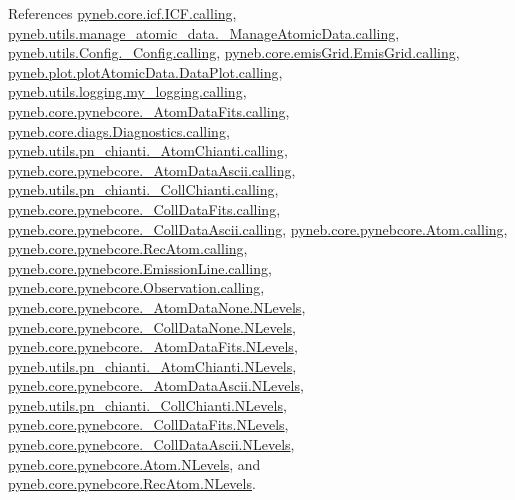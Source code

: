References \hyperlink{icf_8py_source_l00016}{pyneb.\+core.\+icf.\+I\+C\+F.\+calling}, \hyperlink{manage__atomic__data_8py_source_l00018}{pyneb.\+utils.\+manage\+\_\+atomic\+\_\+data.\+\_\+\+Manage\+Atomic\+Data.\+calling}, \hyperlink{_config_8py_source_l00032}{pyneb.\+utils.\+Config.\+\_\+\+Config.\+calling}, \hyperlink{emis_grid_8py_source_l00041}{pyneb.\+core.\+emis\+Grid.\+Emis\+Grid.\+calling}, \hyperlink{plot_atomic_data_8py_source_l00042}{pyneb.\+plot.\+plot\+Atomic\+Data.\+Data\+Plot.\+calling}, \hyperlink{logging_8py_source_l00044}{pyneb.\+utils.\+logging.\+my\+\_\+logging.\+calling}, \hyperlink{pynebcore_8py_source_l00090}{pyneb.\+core.\+pynebcore.\+\_\+\+Atom\+Data\+Fits.\+calling}, \hyperlink{diags_8py_source_l00169}{pyneb.\+core.\+diags.\+Diagnostics.\+calling}, \hyperlink{pn__chianti_8py_source_l00223}{pyneb.\+utils.\+pn\+\_\+chianti.\+\_\+\+Atom\+Chianti.\+calling}, \hyperlink{pynebcore_8py_source_l00311}{pyneb.\+core.\+pynebcore.\+\_\+\+Atom\+Data\+Ascii.\+calling}, \hyperlink{pn__chianti_8py_source_l00414}{pyneb.\+utils.\+pn\+\_\+chianti.\+\_\+\+Coll\+Chianti.\+calling}, \hyperlink{pynebcore_8py_source_l00568}{pyneb.\+core.\+pynebcore.\+\_\+\+Coll\+Data\+Fits.\+calling}, \hyperlink{pynebcore_8py_source_l00918}{pyneb.\+core.\+pynebcore.\+\_\+\+Coll\+Data\+Ascii.\+calling}, \hyperlink{pynebcore_8py_source_l01175}{pyneb.\+core.\+pynebcore.\+Atom.\+calling}, \hyperlink{pynebcore_8py_source_l02572}{pyneb.\+core.\+pynebcore.\+Rec\+Atom.\+calling}, \hyperlink{pynebcore_8py_source_l03263}{pyneb.\+core.\+pynebcore.\+Emission\+Line.\+calling}, \hyperlink{pynebcore_8py_source_l03419}{pyneb.\+core.\+pynebcore.\+Observation.\+calling}, \hyperlink{pynebcore_8py_source_l00062}{pyneb.\+core.\+pynebcore.\+\_\+\+Atom\+Data\+None.\+N\+Levels}, \hyperlink{pynebcore_8py_source_l00075}{pyneb.\+core.\+pynebcore.\+\_\+\+Coll\+Data\+None.\+N\+Levels}, \hyperlink{pynebcore_8py_source_l00155}{pyneb.\+core.\+pynebcore.\+\_\+\+Atom\+Data\+Fits.\+N\+Levels}, \hyperlink{pn__chianti_8py_source_l00268}{pyneb.\+utils.\+pn\+\_\+chianti.\+\_\+\+Atom\+Chianti.\+N\+Levels}, \hyperlink{pynebcore_8py_source_l00404}{pyneb.\+core.\+pynebcore.\+\_\+\+Atom\+Data\+Ascii.\+N\+Levels}, \hyperlink{pn__chianti_8py_source_l00446}{pyneb.\+utils.\+pn\+\_\+chianti.\+\_\+\+Coll\+Chianti.\+N\+Levels}, \hyperlink{pynebcore_8py_source_l00637}{pyneb.\+core.\+pynebcore.\+\_\+\+Coll\+Data\+Fits.\+N\+Levels}, \hyperlink{pynebcore_8py_source_l00984}{pyneb.\+core.\+pynebcore.\+\_\+\+Coll\+Data\+Ascii.\+N\+Levels}, \hyperlink{pynebcore_8py_source_l01260}{pyneb.\+core.\+pynebcore.\+Atom.\+N\+Levels}, and \hyperlink{pynebcore_8py_source_l02585}{pyneb.\+core.\+pynebcore.\+Rec\+Atom.\+N\+Levels}.




